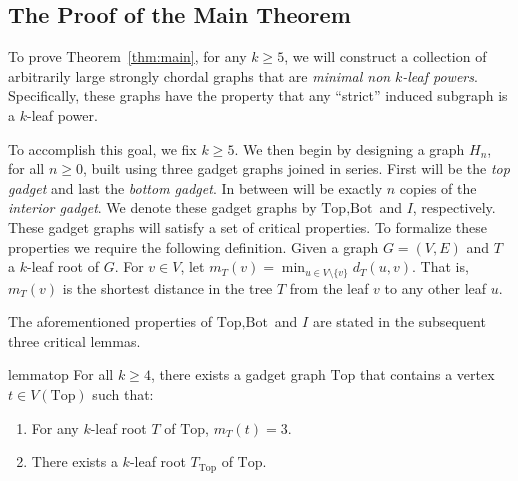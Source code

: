\documentclass[11pt,letter]{article}
\theoremstyle{remark}
\newcommand{\T}{\text{Top}}
\newcommand{\B}{\text{Bot}}
\begin{document}
 


\subsection{The Proof of the Main Theorem}

To prove Theorem~\ref{thm:main}, for any $k\ge 5$, we will construct a collection of arbitrarily large strongly chordal graphs that are \emph{minimal non }$k$\emph{-leaf powers}. Specifically, these graphs have the property that any ``strict'' induced subgraph is a $k$-leaf power.

To accomplish this goal, we fix $k\ge 5$. We then begin by designing a graph $H_n$, for all $n\geq 0$,
built using three gadget graphs joined in series. First will be the {\em top gadget} and last the {\em bottom gadget}. In between will be exactly $n$ copies of the 
{\em interior gadget}.
We denote these gadget graphs by $\T, \B$ and $I$,
respectively. These gadget graphs will satisfy a set
of critical properties. To formalize these properties we require the following definition.
Given a graph $G=(V,E)$ and $T$ a $k$-leaf root of $G$. For $v\in V$, let $m_T(v)=\min_{u\in V\setminus \{v\}} d_T(u,v)$. That is, $m_T(v)$ is the shortest distance in the tree $T$ from the leaf $v$ to any other leaf $u$. 

The aforementioned properties of $\T, \B$ and $I$ are stated in the subsequent three critical lemmas.

\begin{restatable}{lemma}{top}
    \label{lem:top}
For all $k\geq 4 $, there exists a gadget graph $\T$ that contains a vertex $t\in V(\T)$ such that:
\begin{enumerate}
        \item For any $k$-leaf root $T$ of $\T$, $m_{T}(t) = 3$.
        \item There exists a $k$-leaf root $T_{\T}$ of  $\T$.
    \end{enumerate}
\end{restatable}
\end{document}
